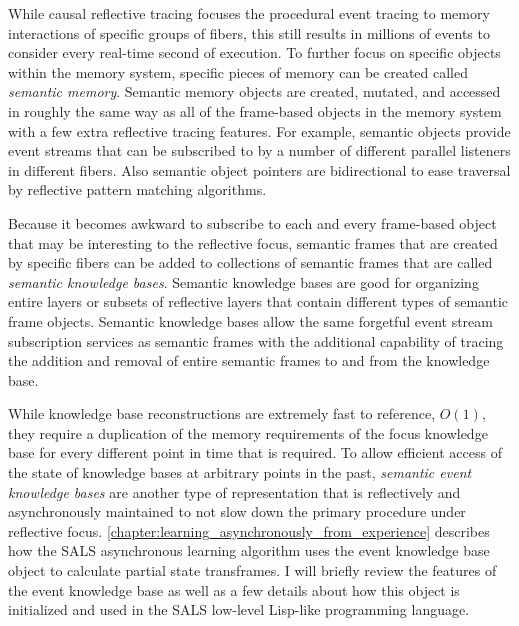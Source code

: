 While causal reflective tracing focuses the procedural event tracing
to memory interactions of specific groups of fibers, this still
results in millions of events to consider every real-time second of
execution.  To further focus on specific objects within the memory
system, specific pieces of memory can be created called
{\emph{semantic memory}}.  Semantic memory objects are created,
mutated, and accessed in roughly the same way as all of the
frame-based objects in the memory system with a few extra reflective
tracing features.  For example, semantic objects provide event streams
that can be subscribed to by a number of different parallel listeners
in different fibers.  Also semantic object pointers are bidirectional
to ease traversal by reflective pattern matching algorithms.

Because it becomes awkward to subscribe to each and every frame-based
object that may be interesting to the reflective focus, semantic
frames that are created by specific fibers can be added to collections
of semantic frames that are called {\emph{semantic knowledge bases}}.
Semantic knowledge bases are good for organizing entire layers or
subsets of reflective layers that contain different types of semantic
frame objects.  Semantic knowledge bases allow the same forgetful
event stream subscription services as semantic frames with the
additional capability of tracing the addition and removal of entire
semantic frames to and from the knowledge base.

While knowledge base reconstructions are extremely fast to reference,
$O(1)$, they require a duplication of the memory requirements of the
focus knowledge base for every different point in time that is
required.  To allow efficient access of the state of knowledge bases
at arbitrary points in the past, {\emph{semantic event knowledge
    bases}} are another type of representation that is reflectively
and asynchronously maintained to not slow down the primary procedure
under reflective focus.
{\mbox{\autoref{chapter:learning_asynchronously_from_experience}}}
describes how the SALS asynchronous learning algorithm uses the event
knowledge base object to calculate partial state transframes.  I will
briefly review the features of the event knowledge base as well as a
few details about how this object is initialized and used in the SALS
low-level Lisp-like programming language.

